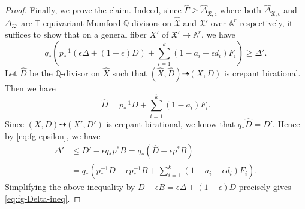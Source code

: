 \documentclass[reqno, 12pt]{amsart}
\theoremstyle{definition}
\newcommand{\bA}{\mathbb{A}}
\newcommand{\bQ}{\mathbb{Q}}
\newcommand{\bT}{\mathbb{T}}
\newcommand{\fg}{\mathfrak{g}}
\newcommand{\hX}{\widehat{X}}
\newcommand{\Supp}{\mathrm{Supp}}
\newcommand{\fX}{\mathfrak{X}}
\newcommand{\fD}{\mathfrak{D}}
\newcommand{\fP}{\mathfrak{P}}
\newcommand{\hD}{\widehat{D}}
\newcommand{\hfX}{\widehat{\mathfrak{X}}}
\newcommand{\hfP}{\widehat{\mathfrak{P}}}
\newcommand{\hGamma}{\widehat{\Gamma}}
\newcommand{\hDelta}{\widehat{\Delta}}
\numberwithin{equation}{section}
\newcommand{\YL}[1]{{\textcolor{blue}{[Yuchen: #1]}}}
\begin{document}
\begin{proof}
Finally, we prove the claim. Indeed, since $\hGamma\geq \hDelta_{\fX,\epsilon}$ where both $ \hDelta_{\fX,\epsilon}$ and  $\Delta_{\fX'}$ are $\bT$-equivariant Mumford $\bQ$-divisors on $\hfX$ and $\fX'$ over $\bA^r$ respectively, it suffices to show that on a general fiber $ X'$ of $\fX'\to \bA^r$, we have 
\begin{equation}\label{eq:fg-Delta-ineq}
q_* (p_*^{-1}(\epsilon \Delta+ (1-\epsilon) D) + \sum_{i=1}^k (1-a_i -\epsilon d_i) F_i) \geq \Delta'.
\end{equation}
Let $\hD$ be the $\bQ$-divisor on $\hX$ such that $(\hX, \hD) \dashrightarrow (X,D)$ is crepant birational. Then we have 
\[
\hD = p_*^{-1} D + \sum_{i=1}^k (1-a_i) F_i. 
\]
Since $(X,D)\dashrightarrow (X', D')$ is crepant birational, we know that $q_* \hD = D'$. Hence by \eqref{eq:fg-epsilon}, we have 
\begin{align*}
\Delta' & \leq D' - \epsilon q_* p^*B = q_* (\hD - \epsilon p^*B) \\
& = q_* (p_*^{-1}D - \epsilon p_*^{-1}B + \sum_{i=1}^k (1-a_i -\epsilon d_i) F_i). 
\end{align*}
Simplifying the above inequality by $D-\epsilon B = \epsilon\Delta+ (1-\epsilon) D$ precisely gives \eqref{eq:fg-Delta-ineq}. 
\end{proof}





\end{document}
